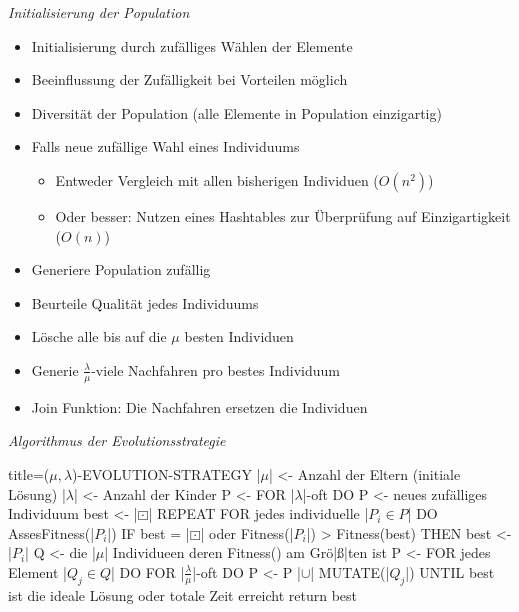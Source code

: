 \documentclass[
    ngerman,
    color=3b,
    dark_mode,
    load_common, %
    summary,
    boxarc,
]{tuda_summary}
\begin{document}
\textit{Initialisierung der Population}
\begin{itemize}
    \item Initialisierung durch zufälliges Wählen der Elemente
    \item Beeinflussung der Zufälligkeit bei Vorteilen möglich
    \item Diversität der Population (alle Elemente in Population einzigartig)
    \item Falls neue zufällige Wahl eines Individuums
          \begin{itemize}
              \item Entweder Vergleich mit allen bisherigen Individuen ($O(n^2)$)
              \item Oder besser: Nutzen eines Hashtables zur Überprüfung auf Einzigartigkeit ($O(n)$)
          \end{itemize}
\end{itemize}
\clearpage
\begin{idea}[Evolutionsstrategie]\mbox{}
    \begin{itemize}
        \item Generiere Population zufällig
        \item Beurteile Qualität jedes Individuums
        \item Lösche alle bis auf die $\mu$ besten Individuen
        \item Generie $\frac{\lambda}{\mu}$-viele Nachfahren pro bestes Individuum
        \item Join Funktion: Die Nachfahren ersetzen die Individuen
    \end{itemize}
\end{idea}

\textit{Algorithmus der Evolutionsstrategie}

\begin{codeBlock}[autogobble,escapeinside=||]{title={($\mu, \lambda$)-EVOLUTION-STRATEGY}}
    |$\mu$| <- Anzahl der Eltern (initiale Lösung)
    |$\lambda$| <- Anzahl der Kinder
    P <- {}
    FOR |$\lambda$|-oft DO
        P <- {neues zufälliges Individuum}
    best <- |$\boxdot$|
    REPEAT
        FOR jedes individuelle |$P_i \in P$| DO
            AssesFitness(|$P_i$|)
            IF best = |$\boxdot$| oder Fitness(|$P_i$|) > Fitness(best) THEN
                best <- |$P_i$|
        Q <- die |$\mu$| Individueen deren Fitness() am Grö|\ss{}|ten ist
        P <- {}
        FOR jedes Element |$Q_j \in Q$| DO
            FOR |$\frac{\lambda}{\mu}$|-oft DO
                P <- P |$\cup$| {MUTATE(|$Q_j$|)}
    UNTIL best ist die ideale Lösung oder totale Zeit erreicht
    return best
\end{codeBlock}
\end{document}
